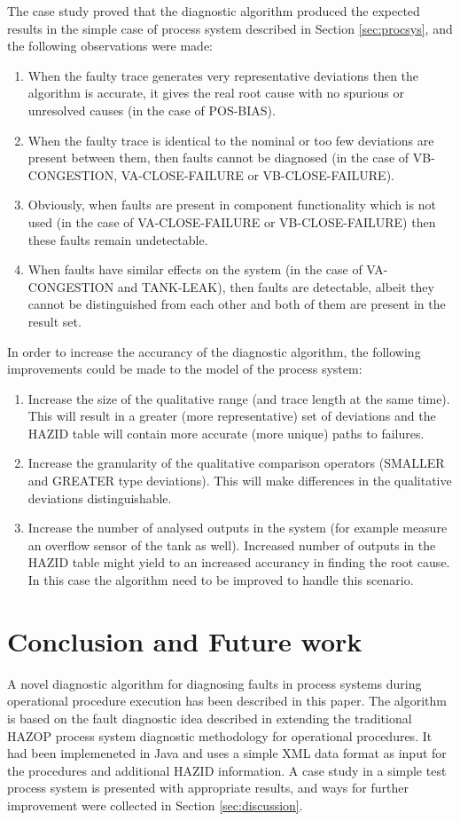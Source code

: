 \documentclass[conference]{IEEEtran}
\begin{document}
The case study proved that the diagnostic algorithm produced the expected results in the simple case of process system described in Section \ref{sec:procsys}, and the following observations were made:

\begin{enumerate}
\item When the faulty trace generates very representative deviations then the algorithm is accurate, it gives the real root cause with no spurious or unresolved causes (in the case of POS-BIAS).
\item When the faulty trace is identical to the nominal or too few deviations are present between them, then faults cannot be diagnosed (in the case of VB-CONGESTION, VA-CLOSE-FAILURE or VB-CLOSE-FAILURE).
\item Obviously, when faults are present in component functionality which is not used (in the case of VA-CLOSE-FAILURE or VB-CLOSE-FAILURE) then these faults remain undetectable.
\item When faults have similar effects on the system (in the case of VA-CONGESTION and TANK-LEAK), then faults are detectable, albeit they cannot be distinguished from each other and both of them are present in the result set.
\end{enumerate}

In order to increase the accurancy of the diagnostic algorithm, the following improvements could be made to the model of the process system:
\begin{enumerate}
\item Increase the size of the qualitative range (and trace length at the same time). This will result in a greater (more representative) set of deviations and the HAZID table will contain more accurate (more unique) paths to failures.
\item Increase the granularity of the qualitative comparison operators (SMALLER and GREATER type deviations). This will make differences in the qualitative deviations distinguishable.
\item Increase the number of analysed outputs in the system (for example measure an overflow sensor of the tank as well). Increased number of outputs in the HAZID table might yield to an increased accurancy in finding the root cause. In this case the algorithm need to be improved to handle this scenario.
\end{enumerate}

\section {Conclusion and Future work}
A novel diagnostic algorithm for diagnosing faults in process systems during operational procedure execution has been described in this paper. The algorithm is based on the fault diagnostic idea described in \cite{KES2011} extending the traditional HAZOP process system diagnostic methodology for operational procedures. It had been implemeneted in Java and uses a simple XML data format as input for the procedures and additional HAZID information. A case study in a simple test process system is presented with appropriate results, and ways for further improvement were collected in Section \ref{sec:discussion}.
\end{document}
